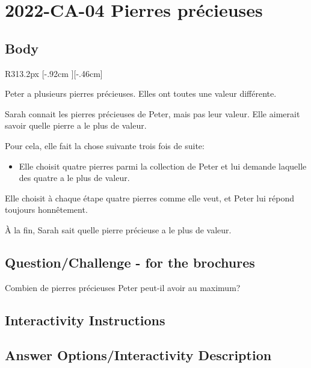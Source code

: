 \documentclass[a4paper,11pt]{report}
\newcommand{\taskGraphicsFolder}{..}
\begin{document}
\section*{\centering{} 2022-CA-04 Pierres précieuses}


\subsection*{Body}

\begin{wrapfigure}{R}{313.2px}
\raisebox{-.46cm}[\dimexpr \height-.92cm \relax][-.46cm]{}
\end{wrapfigure}

Peter a plusieurs pierres précieuses. Elles ont toutes une valeur différente.

Sarah connait les pierres précieuses de Peter, mais pas leur valeur. Elle aimerait savoir quelle pierre a le plus de valeur.

Pour cela, elle fait la chose suivante trois fois de suite:

\begin{itemize}
  \item Elle choisit quatre pierres parmi la collection de Peter et lui demande laquelle des quatre a le plus de valeur.
\end{itemize}

Elle choisit à chaque étape quatre pierres comme elle veut, et Peter lui répond toujours honnêtement.

À la fin, Sarah sait quelle pierre précieuse a le plus de valeur.

{\em


\subsection*{Question/Challenge - for the brochures}

Combien de pierres précieuses Peter peut-il avoir au maximum?

}


\subsection*{Interactivity Instructions}



\begingroup
\renewcommand{\arraystretch}{1.5}
\subsection*{Answer Options/Interactivity Description}
\end{document}
